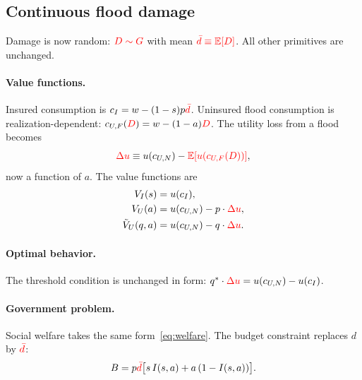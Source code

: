 \documentclass[12pt]{article}
\begin{document}
\subsection{Continuous flood damage}

Damage is now random: $\textcolor{red}{D\sim G}$ with mean $\textcolor{red}{\bar{d}\equiv\mathbb{E}[D]}$. All other primitives are unchanged.

\paragraph{Value functions.}
Insured consumption is $c_I=w-(1-s)p\textcolor{red}{\bar{d}}$. Uninsured flood consumption is realization-dependent: $c_{U,F}(\textcolor{red}{D})=w-(1-a)\textcolor{red}{D}$. The utility loss from a flood becomes
\[
    \textcolor{red}{\Delta u} \equiv u(c_{U,N}) - \textcolor{red}{\mathbb{E}[u(c_{U,F}(D))]},
\]
now a function of $a$. The value functions are
\begin{align}
    V_I(s) &= u(c_I), \\
    V_U(a) &= u(c_{U,N}) - p\cdot\textcolor{red}{\Delta u}, \\
    \tilde{V}_U(q,a) &= u(c_{U,N}) - q\cdot\textcolor{red}{\Delta u}.
\end{align}

\paragraph{Optimal behavior.}
The threshold condition is unchanged in form: $q^*\cdot\textcolor{red}{\Delta u}=u(c_{U,N})-u(c_I)$.

\paragraph{Government problem.}
Social welfare takes the same form~\eqref{eq:welfare}. The budget constraint replaces $d$ by $\textcolor{red}{\bar{d}}$:
\[
    B=p\textcolor{red}{\bar{d}}\bigl[s\,I(s,a)+a\,(1-I(s,a))\bigr].
\]
\end{document}
